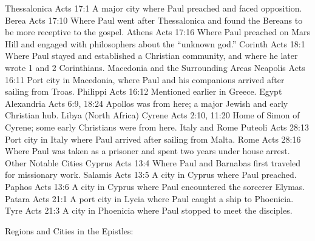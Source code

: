 \textbar{} \textbar{} \textbar{} Thessalonica \textbar{} Acts 17:1 \textbar{} A major city where Paul preached and faced opposition.
\textbar{} \textbar{} \textbar{} Berea \textbar{} Acts 17:10 \textbar{} Where Paul went after Thessalonica and found the Bereans to be more receptive to the gospel.
\textbar{} \textbar{} \textbar{} Athens \textbar{} Acts 17:16 \textbar{} Where Paul preached on Mars Hill and engaged with philosophers about the ``unknown god.'' \textbar{} \textbar{} \textbar{} Corinth \textbar{} Acts 18:1 \textbar{} Where Paul stayed and established a Christian community, and where he later wrote 1 and 2 Corinthians.
\textbar{} \textbar{} Macedonia and the Surrounding Areas \textbar{} Neapolis \textbar{} Acts 16:11 \textbar{} Port city in Macedonia, where Paul and his companions arrived after sailing from Troas.
\textbar{} \textbar{} \textbar{} Philippi \textbar{} Acts 16:12 \textbar{} Mentioned earlier in Greece.
\textbar{} \textbar{} Egypt \textbar{} Alexandria \textbar{} Acts 6:9, 18:24 \textbar{} Apollos was from here; a major Jewish and early Christian hub.
\textbar{} \textbar{} Libya (North Africa) \textbar{} Cyrene \textbar{} Acts 2:10, 11:20 \textbar{} Home of Simon of Cyrene; some early Christians were from here.
\textbar{} \textbar{} Italy and Rome \textbar{} Puteoli \textbar{} Acts 28:13 \textbar{} Port city in Italy where Paul arrived after sailing from Malta.
\textbar{} \textbar{} \textbar{} Rome \textbar{} Acts 28:16 \textbar{} Where Paul was taken as a prisoner and spent two years under house arrest.
\textbar{} \textbar{} Other Notable Cities \textbar{} Cyprus \textbar{} Acts 13:4 \textbar{} Where Paul and Barnabas first traveled for missionary work.
\textbar{} \textbar{} \textbar{} Salamis \textbar{} Acts 13:5 \textbar{} A city in Cyprus where Paul preached.
\textbar{} \textbar{} \textbar{} Paphos \textbar{} Acts 13:6 \textbar{} A city in Cyprus where Paul encountered the sorcerer Elymas.
\textbar{} \textbar{} \textbar{} Patara \textbar{} Acts 21:1 \textbar{} A port city in Lycia where Paul caught a ship to Phoenicia.
\textbar{} \textbar{} \textbar{} Tyre \textbar{} Acts 21:3 \textbar{} A city in Phoenicia where Paul stopped to meet the disciples.
\textbar{}

Regions and Cities in the Epistles:

